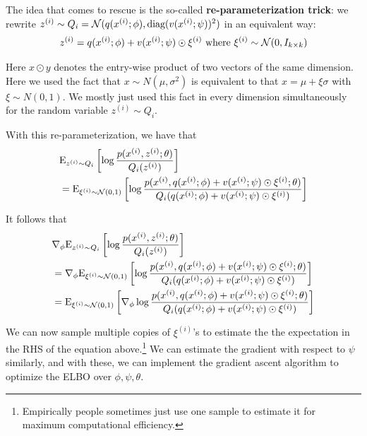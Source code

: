 \documentclass{article}
\begin{document}
The idea that comes to rescue is the so-called {\bf re-parameterization trick}: we rewrite ${z^{(i)}} \sim Q_i = \mathcal{N}(q({x^{(i)}};\phi), \textup{diag}(v({x^{(i)}};\psi))^2)$ in an equivalent way: 
\begin{align}
{z^{(i)}} = q({x^{(i)}};\phi) + v({x^{(i)}};\psi)  \odot \xi^{(i)} \textup{ where }\xi^{(i)}\sim \mathcal{N}(0,I_{k\times k})
\end{align}

Here $x \odot y$ denotes the entry-wise product of two vectors of the same dimension. Here we used the fact that $x\sim N(\mu, \sigma^2)$ is equivalent to that $x = \mu + \xi \sigma$ with $\xi\sim N(0,1)$. We mostly just used this fact in every dimension simultaneously for the random variable $z^{(i)} \sim Q_i$. 

With this re-parameterization, we have that 
\begin{align}
& {\rm E}_{{z^{(i)}} \sim Q_i}\left[\log \frac{p({x^{(i)}},{z^{(i)}};\theta)}{Q_i({z^{(i)}})}\right] \\
& = {\rm E}_{\xi^{(i)}\sim \mathcal{N}(0,1)}\left[\log \frac{p({x^{(i)}},q({x^{(i)}};\phi) + v({x^{(i)}};\psi)\odot \xi^{(i)};\theta)}{Q_i(q({x^{(i)}};\phi) + v({x^{(i)}};\psi)\odot \xi^{(i)} )}\right]\nonumber
\end{align}

It follows that 
\begin{align}
& \nabla_\phi {\rm E}_{{z^{(i)}} \sim Q_i}\left[\log \frac{p({x^{(i)}},{z^{(i)}};\theta)}{Q_i({z^{(i)}})}\right] \nonumber\\
& =  \nabla_\phi {\rm E}_{\xi^{(i)}\sim \mathcal{N}(0,1)}\left[\log \frac{p({x^{(i)}},q({x^{(i)}};\phi) + v({x^{(i)}};\psi)\odot \xi^{(i)};\theta)}{Q_i(q({x^{(i)}};\phi) + v({x^{(i)}};\psi)\odot \xi^{(i)} )}\right]\nonumber\\
& =  {\rm E}_{\xi^{(i)}\sim \mathcal{N}(0,1)}\left[ \nabla_\phi\log \frac{p({x^{(i)}},q({x^{(i)}};\phi) + v({x^{(i)}};\psi)\odot \xi^{(i)};\theta)}{Q_i(q({x^{(i)}};\phi) + v({x^{(i)}};\psi)\odot \xi^{(i)} )}\right]\nonumber
\end{align}

We can now sample multiple copies of $\xi^{(i)}$'s to estimate the the expectation in the RHS of the equation above.\footnote{Empirically people sometimes just use one sample to estimate it for maximum computational efficiency.} We can estimate the gradient with respect to $\psi$ similarly, and with these, we can implement the gradient ascent algorithm to optimize the ELBO over $\phi, \psi, \theta.$
\end{document}
